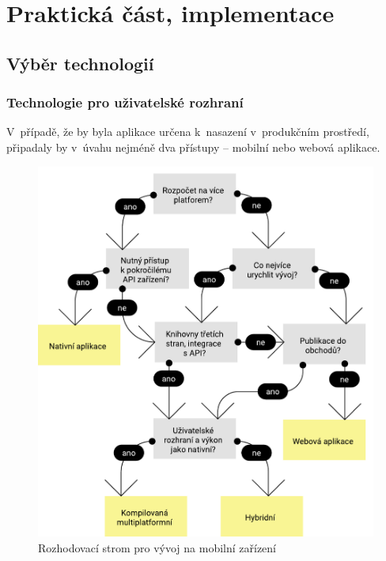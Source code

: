 \documentclass[twoside]{ctuthesis}
\begin{document}
\newpage

\part{Praktická část, implementace}

\chapter{Výběr technologií}

\section{Technologie pro uživatelské rozhraní}

V~případě, že by byla aplikace určena k~nasazení v~produkčním prostředí, připadaly by v~úvahu nejméně dva přístupy -- mobilní nebo webová aplikace.

\begin{figure}[h!]
	\includegraphics[scale=0.7]{img/app-decision-tree.pdf}
	\caption{Rozhodovací strom pro vývoj na mobilní zařízení}
	\label{appdecisiontree}
\end{figure}
\end{document}
